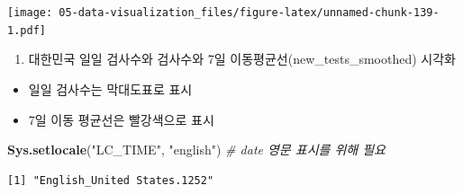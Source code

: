 \documentclass[
  11pt,
]{krantz}
\newenvironment{Shaded}{\begin{snugshade}}{\end{snugshade}}
\newcommand{\CommentTok}[1]{\textcolor[rgb]{0.37,0.37,0.37}{\textit{#1}}}
\newcommand{\KeywordTok}[1]{\textcolor[rgb]{0.27,0.27,0.27}{\textbf{#1}}}
\newcommand{\NormalTok}[1]{#1}
\newcommand{\StringTok}[1]{\textcolor[rgb]{0.5,0.5,0.5}{#1}}
\providecommand{\tightlist}{%
  \setlength{\itemsep}{0pt}\setlength{\parskip}{0pt}}
\begin{document}
\texttt{[image: 05-data-visualization\_files/figure-latex/unnamed-chunk-139-1.pdf]}

\normalsize

\begin{enumerate}
\def\labelenumi{\arabic{enumi}.}
\setcounter{enumi}{1}
\tightlist
\item
  대한민국 일일 검사수와 검사수와 7일 이동평균선(new\_tests\_smoothed) 시각화
\end{enumerate}

\begin{itemize}
\tightlist
\item
  일일 검사수는 막대도표로 표시
\item
  7일 이동 평균선은 빨강색으로 표시
\end{itemize}

\footnotesize

\begin{Shaded}
\begin{Highlighting}[]
\KeywordTok{Sys.setlocale}\NormalTok{(}\StringTok{"LC_TIME"}\NormalTok{, }\StringTok{"english"}\NormalTok{) }\CommentTok{# date 영문 표시를 위해 필요}
\end{Highlighting}
\end{Shaded}

\begin{verbatim}
[1] "English_United States.1252"
\end{verbatim}
\end{document}

